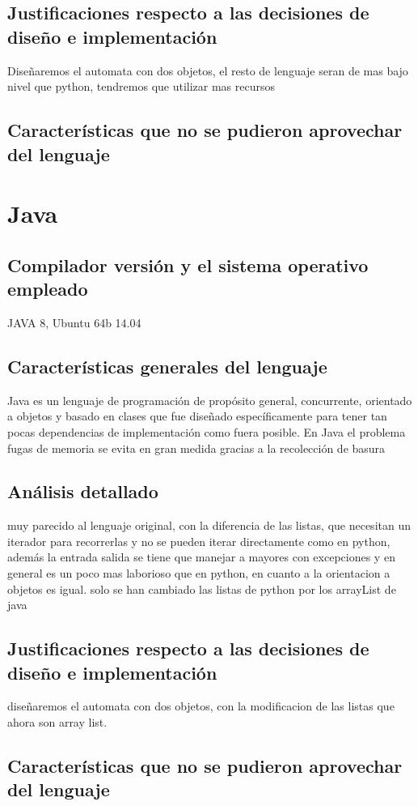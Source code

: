 \documentclass[]{scrartcl}
\begin{document}
  \subsection{Justificaciones respecto a las decisiones de diseño e implementaci\'on}
  Diseñaremos el automata con dos objetos, el resto de lenguaje seran de mas bajo nivel que python, tendremos que utilizar mas recursos
  \subsection{Caracter\'isticas que no se pudieron aprovechar del lenguaje}
  \section{Java}
   \subsection{Compilador versi\'on y el sistema operativo empleado}
   JAVA 8, Ubuntu 64b 14.04
    \subsection{Caracter\'isticas generales del lenguaje}
    Java es un lenguaje de programación de propósito general, concurrente, orientado a objetos y basado en clases que fue diseñado específicamente para tener tan pocas dependencias de implementación como fuera posible.
    En Java el problema fugas de memoria se evita en gran medida gracias a la recolección de basura
    \subsection{An\'alisis detallado}
    muy parecido al lenguaje original, con la diferencia de las listas, que necesitan un iterador para recorrerlas y no se pueden iterar
    directamente como en python, además la entrada salida se tiene que manejar a mayores con excepciones y en general es un poco mas laborioso que
    en python, en cuanto a la orientacion a objetos es igual. solo se han cambiado las listas de python por los arrayList de java
    \subsection{Justificaciones respecto a las decisiones de diseño e implementaci\'on}
    diseñaremos el automata con dos objetos, con la modificacion de las listas que ahora son array list.
    \subsection{Caracter\'isticas que no se pudieron aprovechar del lenguaje}
\end{document}

